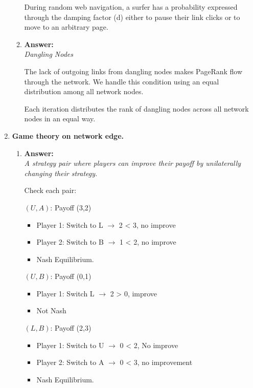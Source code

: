\documentclass[a4paper,12pt]{article}
\begin{document}
\begin{enumerate}[label=\textbf{Q\arabic*.}]
\begin{enumerate}[label=(\alph*)]
        During random web navigation, a surfer has a probability expressed through the damping factor (d) either to pause their link clicks or to move to an arbitrary page.
        
        \item \textbf{Answer:} \\
        \textit{Dangling Nodes}

        The lack of outgoing links from dangling nodes makes PageRank flow through the network. We handle this condition using an equal distribution among all network nodes.

        Each iteration distributes the rank of dangling nodes across all network nodes in an equal way.
    \end{enumerate}
    
    \item \textbf{Game theory on network edge.}
    \begin{enumerate}[label=(\alph*)]
        \item \textbf{Answer:} \\
        \textit{A strategy pair where players can improve their payoff by unilaterally changing their strategy.}

        Check each pair:

        \((U, A)\): Payoff (3,2)
        \begin{itemize}
            \item Player 1: Switch to L \(\rightarrow\) 2 < 3, no improve
            \item Player 2: Switch to B \(\rightarrow\) 1 < 2, no improve
            \item Nash Equilibrium.
        \end{itemize}

        \((U, B)\): Payoff (0,1)
        \begin{itemize}
            \item Player 1: Switch L \(\rightarrow\) 2 > 0, improve
            \item Not Nash
        \end{itemize}

        \((L, B)\): Payoff (2,3)
        \begin{itemize}
            \item Player 1: Switch to U \(\rightarrow\) 0 < 2, No improve
            \item Player 2: Switch to A \(\rightarrow\) 0 < 3, no improvement
            \item Nash Equilibrium.
        \end{itemize}


\end{enumerate}
\end{enumerate}
\end{document}
